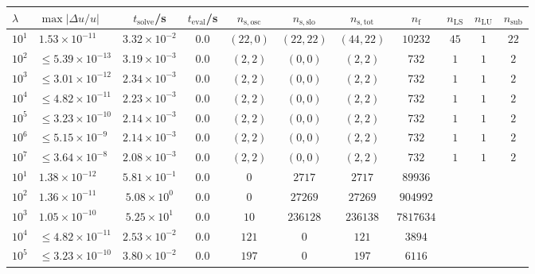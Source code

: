 \begin{tabular}{l l c c c c c c c c c}%
\hline \hline 
$\lambda$  &  $\max|\Delta u/u|$  &  $t_{\mathrm{solve}}$/\si{\s}  &
$t_{\mathrm{eval}}$/\si{\s}  &  $n_{\mathrm{s,osc}}$  &  $n_{\mathrm{s,slo}}$
&  $n_{\mathrm{s,tot}}$  &  $n_{\mathrm{f}}$  &  $n_{\mathrm{LS}}$  &
$n_{\mathrm{LU}}$  &  $n_{\mathrm{sub}}$ \\ \hline
$10^1$  &  $1.53 \times 10^{-11}$  &  $3.32\times 10^{-2}$  &  $0.0$  &  $(22, 0)$  &  $(22, 22)$  &  $(44, 22)$  &  $10232$  &  $45$  &  $1$  &  $22$\\ 
    $10^2$  &  $\leq 5.39 \times 10^{-13}$  &  $3.19\times 10^{-3}$  &  $0.0$  &  $(2, 2)$  &  $(0, 0)$  &  $(2, 2)$  &  $732$  &  $1$  &  $1$  &  $2$\\ 
    $10^3$  &  $\leq 3.01 \times 10^{-12}$  &  $2.34\times 10^{-3}$  &  $0.0$  &  $(2, 2)$  &  $(0, 0)$  &  $(2, 2)$  &  $732$  &  $1$  &  $1$  &  $2$\\ 
$10^4$  &  $\leq 4.82 \times 10^{-11}$  &  $2.23\times 10^{-3}$  &  $0.0$  &  $(2, 2)$  &  $(0, 0)$  &  $(2, 2)$  &  $732$  &  $1$  &  $1$  &  $2$\\ 
$10^5$  &  $\leq 3.23 \times 10^{-10}$  &  $2.14\times 10^{-3}$  &  $0.0$  &  $(2, 2)$  &  $(0, 0)$  &  $(2, 2)$  &  $732$  &  $1$  &  $1$  &  $2$\\ 
$10^6$  &  $\leq 5.15 \times 10^{-9}$  &  $2.14\times 10^{-3}$   &  $0.0$  &  $(2, 2)$  &  $(0, 0)$  &  $(2, 2)$  &  $732$  &  $1$  &  $1$  &  $2$\\ 
$10^7$  &  $\leq 3.64 \times 10^{-8}$  &  $2.08\times 10^{-3}$  &  $0.0$  &  $(2, 2)$  &  $(0, 0)$  &  $(2, 2)$  &  $732$  &  $1$  &  $1$  &  $2$\\ 
\hline \hline
$10^1$  &  $1.38 \times 10^{-12}$  &  $5.81 \times 10^{-1}$  &  $0.0$  &  $0$  &  $2717$  &  $2717$  &  $89936$ & & &  \\ 
$10^2$  &  $1.36 \times 10^{-11}$  &  $5.08 \times 10^{0}$  &  $0.0$  &  $0$  &  $27269$  &  $27269$  &  $904992$  & & & \\ 
$10^3$  &  $1.05 \times 10^{-10}$  &  $5.25 \times 10^{1}$  &  $0.0$  &  $10$  &  $236128$  &  $236138$  &  $7817634$  & & & \\ 
    $10^4$  &  $\leq 4.82 \times 10^{-11}$  &  $2.53 \times 10^{-2}$  &  $0.0$  &  $121$  &  $0$  &  $121$  &  $3894$  & & & \\ 
    $10^5$  &  $\leq 3.23 \times 10^{-10}$  &  $3.80 \times 10^{-2}$  &  $0.0$  &  $197$  &  $0$  &  $197$  &  $6116$  & & & \\ 

\end{tabular}
